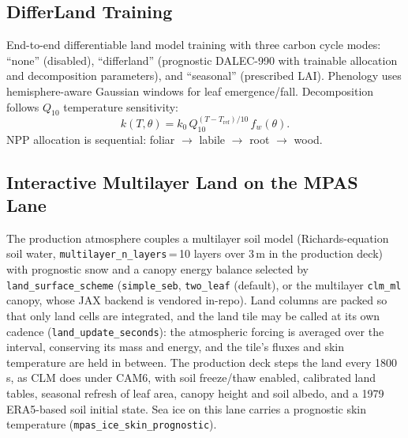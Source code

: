 \documentclass[11pt,a4paper]{article}
\begin{document}
\subsection{DifferLand Training}

End-to-end differentiable land model training with three carbon cycle modes: ``none'' (disabled), ``differland'' (prognostic DALEC-990 with trainable allocation and decomposition parameters), and ``seasonal'' (prescribed LAI).  Phenology uses hemisphere-aware Gaussian windows for leaf emergence/fall.  Decomposition follows $Q_{10}$ temperature sensitivity:
\begin{equation}
  k(T,\theta)=k_0\,Q_{10}^{(T-T_{\mathrm{ref}})/10}\,f_w(\theta).
\end{equation}
NPP allocation is sequential: foliar $\to$ labile $\to$ root $\to$ wood.

\subsection{Interactive Multilayer Land on the MPAS Lane}

The production atmosphere couples a multilayer soil model (Richards-equation soil water, \texttt{multilayer\_n\_layers}\,=\,10 layers over 3\,m in the production deck) with prognostic snow and a canopy energy balance selected by \texttt{land\_surface\_scheme} (\texttt{simple\_seb}, \texttt{two\_leaf} (default), or the multilayer \texttt{clm\_ml} canopy, whose JAX backend is vendored in-repo).  Land columns are packed so that only land cells are integrated, and the land tile may be called at its own cadence (\texttt{land\_update\_seconds}): the atmospheric forcing is averaged over the interval, conserving its mass and energy, and the tile's fluxes and skin temperature are held in between.  The production deck steps the land every 1800\,s, as CLM does under CAM6, with soil freeze/thaw enabled, calibrated land tables, seasonal refresh of leaf area, canopy height and soil albedo, and a 1979 ERA5-based soil initial state.  Sea ice on this lane carries a prognostic skin temperature (\texttt{mpas\_ice\_skin\_prognostic}).

\end{document}
